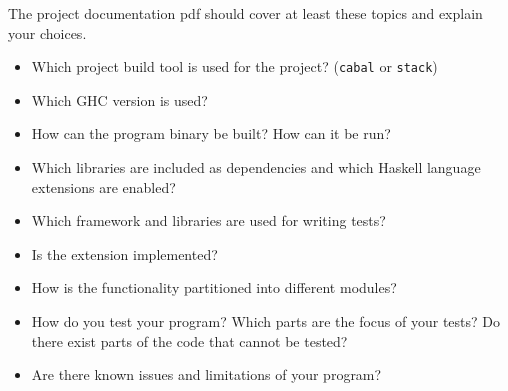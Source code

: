 \documentclass{article}
\begin{document}
The project documentation pdf should cover at least these topics and explain your choices.
\begin{itemize}
\item Which project build tool is used for the project? (\texttt{cabal} or \texttt{stack})
\item Which GHC version is used?
\item How can the program binary be built? How can it be run?
\item Which libraries are included as dependencies and which Haskell language extensions are enabled?
\item Which framework and libraries are used for writing tests?
\item Is the extension implemented?
\item How is the functionality partitioned into different modules?
\item How do you test your program? Which parts are the focus of your tests? Do there exist parts of the code that cannot be tested?
\item Are there known issues and limitations of your program?
\end{itemize}


\printbibliography
\end{document}
